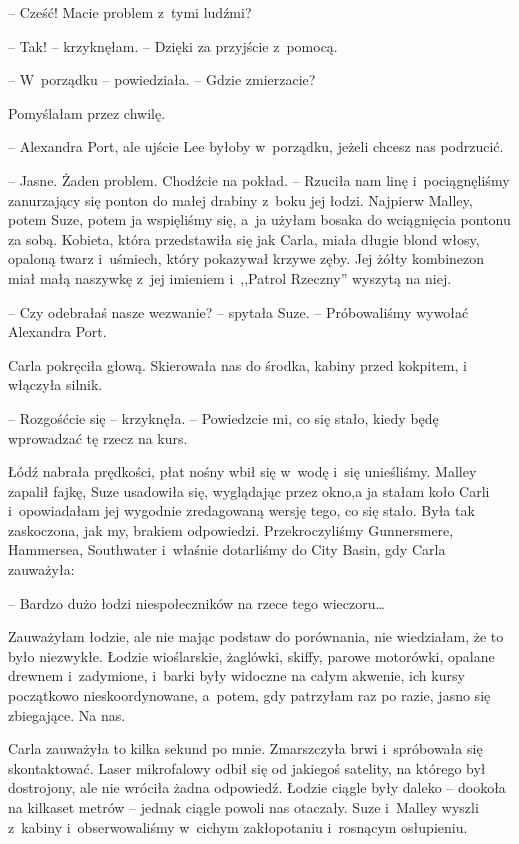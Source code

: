 \documentclass[oneside,polish,11pt,sfheadings]{mwbk}
\begin{document}
-- Cześć! Macie problem z~tymi ludźmi?

-- Tak! -- krzyknęłam. -- Dzięki za przyjście z~pomocą.

-- W~porządku -- powiedziała. -- Gdzie zmierzacie?

Pomyślałam przez chwilę. 

-- Alexandra Port, ale ujście Lee byłoby w~porządku, jeżeli chcesz nas podrzucić.

-- Jasne. Żaden problem. Chodźcie na pokład. -- Rzuciła nam linę i~pociągnęliśmy zanurzający się ponton do małej drabiny z~boku jej łodzi.
Najpierw Malley, potem Suze, potem ja wspięliśmy się, a~ja użyłam bosaka
do wciągnięcia pontonu za sobą. Kobieta, która przedstawiła się jak
Carla, miała długie blond włosy, opaloną twarz i~uśmiech, który
pokazywał krzywe zęby. Jej żółty kombinezon miał małą naszywkę z~jej
imieniem i~,,Patrol Rzeczny'' wyszytą na niej.

-- Czy odebrałaś nasze wezwanie? -- spytała Suze. -- Próbowaliśmy wywołać
Alexandra Port.

Carla pokręciła głową. Skierowała nas do środka, kabiny przed kokpitem,
i włączyła silnik. 

-- Rozgośćcie się -- krzyknęła. -- Powiedzcie mi, co się
stało, kiedy będę wprowadzać tę rzecz na kurs.

Łódź nabrała prędkości, płat nośny wbił się w~wodę i~się unieśliśmy.
Malley zapalił fajkę, Suze usadowiła się, wyglądając przez okno,a ja
stałam koło Carli i~opowiadałam jej wygodnie zredagowaną wersję tego, co
się stało. Była tak zaskoczona, jak my, brakiem odpowiedzi.
Przekroczyliśmy Gunnersmere, Hammersea, Southwater i~właśnie dotarliśmy
do City Basin, gdy Carla zauważyła: 

-- Bardzo dużo łodzi niespołeczników
na rzece tego wieczoru\ldots 

Zauważyłam łodzie, ale nie mając podstaw do porównania, nie wiedziałam,
że to było niezwykłe. Łodzie wioślarskie, żaglówki, skiffy, parowe
motorówki, opalane drewnem i~zadymione, i~barki były widoczne na całym
akwenie, ich kursy początkowo nieskoordynowane, a~potem, gdy patrzyłam
raz po razie, jasno się zbiegające. Na nas.

Carla zauważyła to kilka sekund po mnie. Zmarszczyła brwi i~spróbowała
się skontaktować. Laser mikrofalowy odbił się od jakiegoś satelity, na
którego był dostrojony, ale nie wróciła żadna odpowiedź. Łodzie ciągle
były daleko -- dookoła na kilkaset metrów -- jednak ciągle powoli nas
otaczały. Suze i~Malley wyszli z~kabiny i~obserwowaliśmy w~cichym
zakłopotaniu i~rosnącym osłupieniu.
\end{document}

